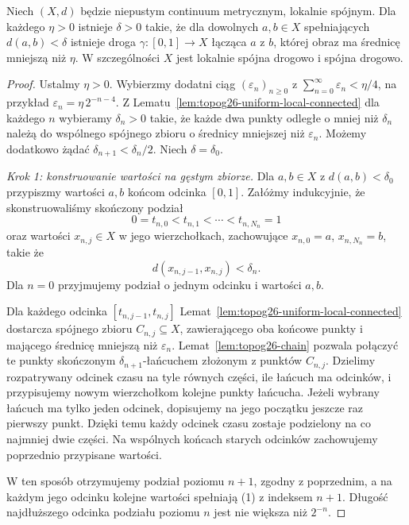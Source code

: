 \begin{twierdzenie}
\label{thm:topog26-small-paths}
Niech \((X,d)\) będzie niepustym
continuum metrycznym, lokalnie spójnym.
Dla każdego \(\eta>0\) istnieje
\(\delta>0\) takie, że dla dowolnych
\(a,b\in X\) spełniających \(d(a,b)<\delta\)
istnieje droga \(\gamma\colon[0,1]\to X\)
łącząca \(a\) z \(b\), której obraz
ma średnicę mniejszą niż \(\eta\).
W szczególności \(X\) jest
lokalnie spójna drogowo i spójna drogowo.
\end{twierdzenie}
\begin{proof}
Ustalmy \(\eta>0\).
Wybierzmy dodatni ciąg \((\varepsilon_n)_{n\ge0}\)
z
\(\sum_{n=0}^{\infty}\varepsilon_n<\eta/4\),
na przykład
\(\varepsilon_n=\eta\,2^{-n-4}\).
Z Lematu~\ref{lem:topog26-uniform-local-connected}
dla każdego \(n\) wybieramy
\(\delta_n>0\) takie, że
każde dwa punkty odległe o mniej
niż \(\delta_n\) należą do
wspólnego spójnego zbioru
o średnicy mniejszej niż \(\varepsilon_n\).
Możemy dodatkowo żądać
\(\delta_{n+1}<\delta_n/2\).
Niech \(\delta=\delta_0\).

\emph{Krok 1: konstruowanie wartości na gęstym zbiorze.}
Dla \(a,b\in X\) z \(d(a,b)<\delta_0\)
przypiszmy wartości \(a,b\)
końcom odcinka \([0,1]\).
Załóżmy indukcyjnie, że skonstruowaliśmy
skończony podział
\[
 0=t_{n,0}<t_{n,1}<\cdots<t_{n,N_n}=1
\]
oraz wartości \(x_{n,j}\in X\)
w jego wierzchołkach, zachowujące
\(x_{n,0}=a\), \(x_{n,N_n}=b\),
takie że
\[
 d(x_{n,j-1},x_{n,j})<\delta_n.
 \tag{1}
\]
Dla \(n=0\) przyjmujemy
podział o jednym odcinku i
wartości \(a,b\).

Dla każdego odcinka
\([t_{n,j-1},t_{n,j}]\)
Lemat~\ref{lem:topog26-uniform-local-connected}
dostarcza spójnego zbioru
\(C_{n,j}\subseteq X\),
zawierającego oba końcowe punkty
i mającego średnicę mniejszą
niż \(\varepsilon_n\).
Lemat~\ref{lem:topog26-chain}
pozwala połączyć te punkty
skończonym \(\delta_{n+1}\)-łańcuchem
złożonym z punktów \(C_{n,j}\).
Dzielimy rozpatrywany odcinek
czasu na tyle równych części,
ile łańcuch ma odcinków,
i przypisujemy nowym wierzchołkom
kolejne punkty łańcucha.
Jeżeli wybrany łańcuch ma
tylko jeden odcinek, dopisujemy
na jego początku jeszcze raz
pierwszy punkt. Dzięki temu
każdy odcinek czasu zostaje
podzielony na co najmniej dwie części.
Na wspólnych końcach starych
odcinków zachowujemy poprzednio
przypisane wartości.

W ten sposób otrzymujemy
podział poziomu \(n+1\),
zgodny z poprzednim,
a na każdym jego odcinku
kolejne wartości spełniają (1)
z indeksem \(n+1\).
Długość najdłuższego odcinka
podziału poziomu \(n\)
jest nie większa niż \(2^{-n}\).


\end{proof}
